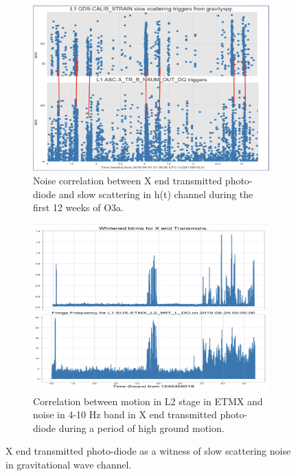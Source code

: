 \documentclass[12pt]{iopart}
\begin{document}
\begin{figure}[h]
   \centering
    \begin{subfigure}[b]{0.43\textwidth}
        \centering
         \includegraphics[width = \textwidth]{htxtrbo3.png}
         \caption{Noise correlation between X end transmitted photo-diode and slow scattering in h(t) channel during the first 12 weeks of O3a.} %
         \label{fig:htxtrbo3}
    \end{subfigure}
    \hfill
    \begin{subfigure}[b]{0.43\textwidth}
        \centering
         \includegraphics[width = \textwidth]{blrmsfringe2.png}
         \caption{Correlation between motion in L2 stage in ETMX and  noise in 4-10 Hz band in X end transmitted photo-diode during a period of high ground motion.}
         \label{fig:blrmsfringe2}
         
    
    \end{subfigure}
    \caption{ X end transmitted photo-diode as a witness of slow scattering noise in gravitational wave channel.}
    \label{fig:transetmx}
\end{figure}
\quad
\end{document}
